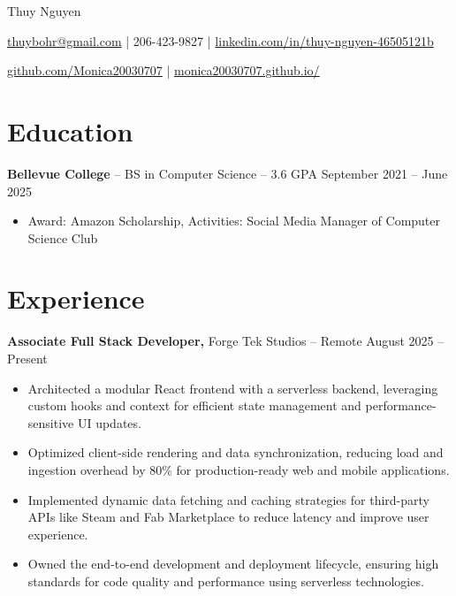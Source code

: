 \documentclass[11pt]{article}       %
\begin{document}
\centerline{\Huge Thuy Nguyen}

\vspace{5pt}

\centerline{\href{mailto:thuybohr@gmail.com}{thuybohr@gmail.com} | 206-423-9827 |
\href{https://www.linkedin.com/in/thuy-nguyen-46505121b/}{linkedin.com/in/thuy-nguyen-46505121b}}

\centerline{\href{https://github.com/Monica20030707}{github.com/Monica20030707} | 
\href{https://monica20030707.github.io/}{monica20030707.github.io/}} 

\vspace{-9pt}

\section*{Education}
\textbf{Bellevue College} -- BS in Computer Science -- 3.6 GPA \hfill September 2021 -- June 2025\\
\vspace{-9pt}
\begin{itemize}
  \item Award: Amazon Scholarship, Activities: Social Media Manager of Computer Science Club
\end{itemize}

\vspace{-18.5pt}

\section*{Experience}

\textbf{Associate Full Stack Developer,} {Forge Tek Studios} -- Remote \hfill August 2025 -- Present 
\vspace{-9pt}
\begin{itemize}
  \item Architected a modular React frontend with a serverless backend, leveraging custom hooks and context for efficient state management and performance-sensitive UI updates.
  \item Optimized client-side rendering and data synchronization, reducing load and ingestion overhead by 80\% for production-ready web and mobile applications.
  \item Implemented dynamic data fetching and caching strategies for third-party APIs like Steam and Fab Marketplace to reduce latency and improve user experience.
  \item Owned the end-to-end development and deployment lifecycle, ensuring high standards for code quality and performance using serverless technologies.
\end{itemize}
\end{document}

